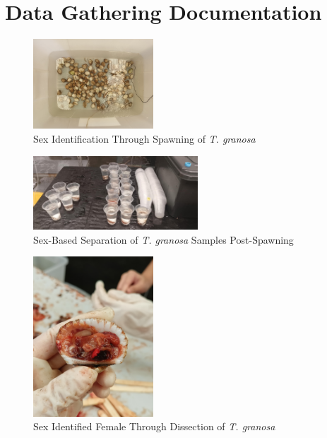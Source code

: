 %
%
%                 

\chapter{Data Gathering Documentation}
\label{sec:appendixc}



%

\begin{figure}[!htbp]
	\centering
	\includegraphics[width=0.4\textwidth, angle=90]{figures/spawning.jpg}
	\caption{Sex Identification Through Spawning of \textit{T. granosa}}
\end{figure}

\begin{figure}[!htbp]
	\centering
	\includegraphics[width=0.55\textwidth]{figures/spawning_separated.jpg}
	\caption{Sex-Based Separation of \textit{T. granosa} Samples Post-Spawning}
\end{figure}

\begin{figure}[!htbp]
	\centering
	\includegraphics[width=0.4\textwidth, angle=90]{figures/dissecting_female.jpg}
	\caption{Sex Identified Female Through Dissection of \textit{T. granosa}}
\end{figure}

